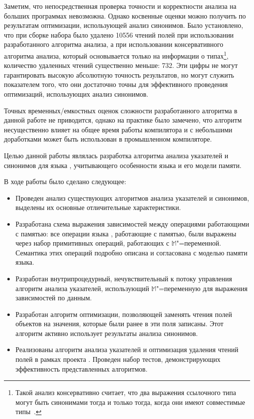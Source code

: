 \documentclass[14pt,titlepage,draft]{extarticle}
\newcommand{\java}{\eng{Java}\xspace}
\newcommand{\M}{\ensuremath{\mathbb{M}}}
\begin{document}
    Заметим, что непосредственная проверка точности и корректности анализа на
    больших программах невозможна. Однако косвенные оценки можно получить по
    результатам оптимизации, использующей анализ синонимов. Было установлено,
    что при сборке набора  было удалено \num{10556} чтений
    полей при использовании разработанного алгоритма анализа, а при
    использовании консервативного алгоритма анализа, который основывается
    только на  информации о типах\footnote{
      Такой анализ консервативно считает, что два выражения ссылочного типа
      могут быть синонимами тогда и только тогда, когда они имеют совместимые
      типы~\cite{diwan_tbaa}.
    },
    количество удаленных чтений существенно меньше: \num{732}.
    Эти цифры не могут гарантировать высокую абсолютную точность результатов,
    но могут служить показателем того, что они достаточно точны для
    эффективного проведения оптимизаций, использующих анализ синонимов.

    Точных временных\slash{}емкостных оценок сложности разработанного алгоритма в
    данной работе не приводится, однако на практике было замечено, что
    алгоритм несущественно влияет на общее время работы компилятора и с
    небольшими доработками может быть использован в промышленном компиляторе.


    Целью данной работы являлась разработка алгоритма анализа указателей и
    синонимов для языка \java, учитывающего особенности языка и его модели
    памяти.

    В ходе работы было сделано следующее:
    \begin{itemize}
      \item Проведен анализ существующих алгоритмов анализа указателей и
            синонимов, выделены их основные отличительные характеристики.
      \item Разработана схема выражения зависимостей между операциями
            работающими с памятью: все операции языка \java, работающие с
            памятью, были выражены через набор примитивных операций, работающих
            с \M"=переменной. Семантика этих операций подробно описана и
            согласована с моделью памяти языка.
      \item Разработан внутрипроцедурный, нечувствительный к потоку управления
            алгоритм анализа указателей, использующий \M"=переменную для
            выражения зависимостей по данным.
      \item Разработан алгоритм оптимизации, позволяющей заменять чтения полей
            объектов на значения, которые были ранее в эти поля записаны. Этот
            алгоритм активно использует результаты анализа синонимов.
      \item Реализованы алгоритм анализа указателей и оптимизация удаления
            чтений полей в рамках проекта . Проведен набор
            тестов, демонстрирующих эффективность представленных алгоритмов.
    \end{itemize}
\end{document}
